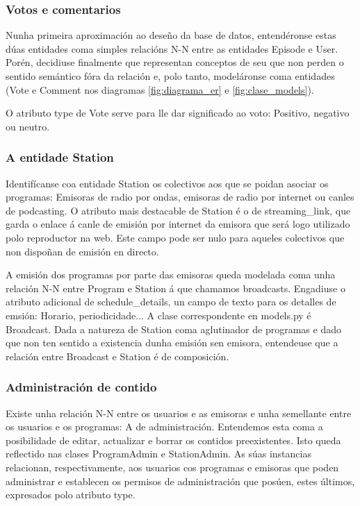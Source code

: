 \subsubsection{Votos e comentarios}

Nunha primeira aproximación ao deseño da base de datos, entendéronse estas dúas entidades coma simples relacións N-N entre as entidades Episode e User. Porén, decidiuse finalmente que representan conceptos de seu que non perden o sentido semántico fóra da relación e, polo tanto, modeláronse coma entidades (Vote e Comment nos diagramas \ref{fig:diagrama_er} e \ref{fig:clase_models}).

O atributo type de Vote serve para lle dar significado ao voto: Positivo, negativo ou neutro.


\subsubsection{A entidade Station}

Identifícanse coa entidade Station os colectivos aos que se poidan asociar os programas: Emisoras de radio por ondas, emisoras de radio por internet ou canles de podcasting. O atributo mais destacable de Station é o de streaming\_link, que garda o enlace á canle de emisión por internet da emisora que será logo utilizado polo reproductor na web. Este campo pode ser nulo para aqueles colectivos que non dispoñan de emisión en directo.  

A emisión dos programas por parte das emisoras queda modelada coma unha relación N-N entre Program e Station á que chamamos broadcasts. Engadiuse o atributo adicional de schedule\_details, un campo de texto para os detalles de emsión: Horario, periodicidade... A clase correspondente en models.py é Broadcast. Dada a natureza de Station coma aglutinador de programas e dado que non ten sentido a existencia dunha emisión sen emisora, entendeuse que a relación entre Broadcast e Station é de composición. 


\subsubsection{Administración de contido}

Existe unha relación N-N entre os usuarios e as emisoras e unha semellante entre os usuarios e os programas: A de administración. Entendemos esta coma a posibilidade de editar, actualizar e borrar os contidos preexistentes. Isto queda reflectido nas clases ProgramAdmin e StationAdmin. As súas instancias relacionan, respectivamente, aos usuarios cos programas e emisoras que poden administrar e establecen os permisos de administración que posúen, estes últimos, expresados polo atributo type.

